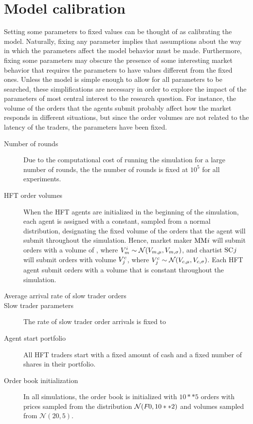 


\section{Model calibration}
Setting some parameters to fixed values can be thought of as calibrating the model. Naturally, fixing any parameter implies that assumptions about the way in which the parameters affect the model behavior must be made. Furthermore, fixing some parameters may obscure the presence of some interesting market behavior that requires the parameters to have values different from the fixed ones. Unless the model is simple enough to allow for all parameters to be searched, these simplifications are necessary in order to explore the impact of the parameters of most central interest to the research question. For instance, the volume of the orders that the agents submit probably affect how the market responds in different situations, but since the order volumes are not related to the latency of the traders, the parameters have been fixed. 
\begin{description}
	\item [Number of rounds] Due to the computational cost of running the simulation for a large number of rounds, the the number of rounds is fixed at $10^5$ for all experiments.
	\item [HFT order volumes] When the HFT agents are initialized in the beginning of the simulation, each agent is assigned with a constant, sampled from a normal distribution, designating the fixed volume of the orders that the agent will submit throughout the simulation. Hence, market maker $\text{MM}_{}{i}$ will submit orders with a volume of , where $V_m^{i} \sim \mathcal{N}(V_{m,\mu}, V_{m,\sigma})$, and chartist $\text{SC}_{}{j}$ will submit orders with volume $V^c_{j}$, where $V^c_{j} \sim \mathcal{N}(V_{c, \mu}, V_{c, \sigma})$.
	Each HFT agent submit orders with a volume that is constant throughout the simulation. 
	\item[Average arrival rate of slow trader orders]
	\item[Slow trader parameters] The rate of slow trader order arrivals is fixed to 
	\item[Agent start portfolio] All HFT traders start with a fixed amount of cash and a fixed number of shares in their portfolio. 
	\item[Order book initialization] In all simulations, the order book is initialized with $10**5 $ orders with prices sampled from the distribution $\mathcal{N}(F_{}{0}, 10**2)$ and volumes sampled  from $\mathcal{N}(20, 5)$.
\end{description}


